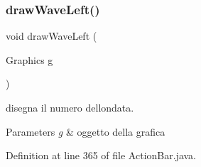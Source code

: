 \subsubsection{\texorpdfstring{draw\+Wave\+Left()}{drawWaveLeft()}}
{\footnotesize\ttfamily void draw\+Wave\+Left (\begin{DoxyParamCaption}\item[{Graphics}]{g }\end{DoxyParamCaption})\hspace{0.3cm}{\ttfamily [private]}}



disegna il numero dell\textquotesingle{}ondata. 


\begin{DoxyParams}{Parameters}
{\em g} & oggetto della grafica \\
\hline
\end{DoxyParams}


Definition at line 365 of file Action\+Bar.\+java.


